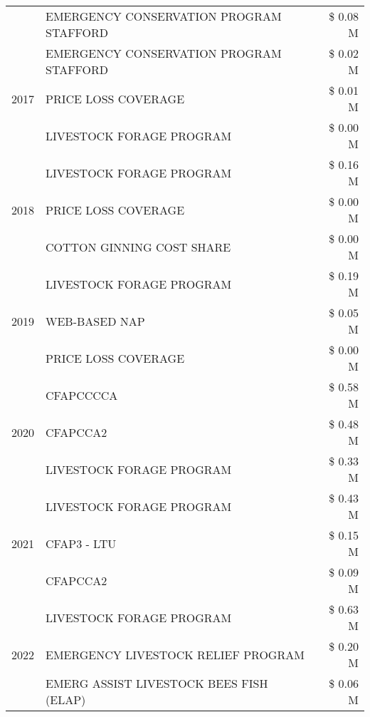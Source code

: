 \begin{tabular}{llr}
 & EMERGENCY CONSERVATION PROGRAM STAFFORD & \$ 0.08 M \\
\cline{1-3}
\multirow[t]{3}{*}{2017} & EMERGENCY CONSERVATION PROGRAM STAFFORD & \$ 0.02 M \\
 & PRICE LOSS COVERAGE & \$ 0.01 M \\
 & LIVESTOCK FORAGE PROGRAM & \$ 0.00 M \\
\cline{1-3}
\multirow[t]{3}{*}{2018} & LIVESTOCK FORAGE PROGRAM & \$ 0.16 M \\
 & PRICE LOSS COVERAGE & \$ 0.00 M \\
 & COTTON GINNING COST SHARE & \$ 0.00 M \\
\cline{1-3}
\multirow[t]{3}{*}{2019} & LIVESTOCK FORAGE PROGRAM & \$ 0.19 M \\
 & WEB-BASED NAP & \$ 0.05 M \\
 & PRICE LOSS COVERAGE & \$ 0.00 M \\
\cline{1-3}
\multirow[t]{3}{*}{2020} & CFAPCCCCA & \$ 0.58 M \\
 & CFAPCCA2 & \$ 0.48 M \\
 & LIVESTOCK FORAGE PROGRAM & \$ 0.33 M \\
\cline{1-3}
\multirow[t]{3}{*}{2021} & LIVESTOCK FORAGE PROGRAM & \$ 0.43 M \\
 & CFAP3 - LTU & \$ 0.15 M \\
 & CFAPCCA2 & \$ 0.09 M \\
\cline{1-3}
\multirow[t]{3}{*}{2022} & LIVESTOCK FORAGE PROGRAM & \$ 0.63 M \\
 & EMERGENCY LIVESTOCK RELIEF PROGRAM & \$ 0.20 M \\
 & EMERG ASSIST LIVESTOCK BEES FISH (ELAP) & \$ 0.06 M \\
\cline{1-3}
\bottomrule
\end{tabular}
